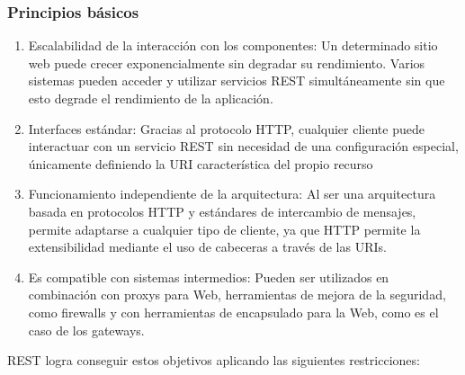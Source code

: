 \subsubsection{Principios básicos}
\begin{enumerate}
\item Escalabilidad de la interacción con los componentes: Un determinado sitio web puede crecer exponencialmente sin degradar su rendimiento. Varios sistemas pueden acceder y utilizar servicios REST simultáneamente sin que esto degrade el rendimiento de la aplicación.
\item Interfaces estándar: Gracias al protocolo HTTP, cualquier cliente puede interactuar con un servicio REST sin necesidad de una configuración especial, únicamente definiendo la URI característica del propio recurso
\item Funcionamiento independiente de la arquitectura: Al ser una arquitectura basada en protocolos HTTP y estándares de intercambio de mensajes, permite adaptarse a cualquier tipo de cliente, ya que HTTP permite la extensibilidad mediante el uso de cabeceras a través de las URIs.
\item Es compatible con sistemas intermedios: Pueden ser utilizados en combinación con proxys para Web, herramientas de mejora de la seguridad, como firewalls y con herramientas de encapsulado para la Web, como es el caso de los gateways.  
\end{enumerate}
\bigskip
\par
REST logra conseguir estos objetivos aplicando las siguientes restricciones:
